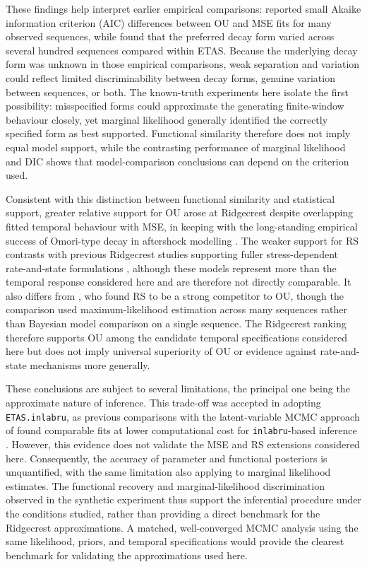 \documentclass{statsmsc}
\begin{document}
These findings help interpret earlier empirical comparisons: \citet{gross1994tests} reported small Akaike information criterion (AIC) differences between OU and MSE fits for many observed sequences, while \citet{hainzl2017testing} found that the preferred decay form varied across several hundred sequences compared within ETAS. Because the underlying decay form was unknown in those empirical comparisons, weak separation and variation could reflect limited discriminability between decay forms, genuine variation between sequences, or both. The known-truth experiments here isolate the first possibility: misspecified forms could approximate the generating finite-window behaviour closely, yet marginal likelihood generally identified the correctly specified form as best supported. Functional similarity therefore does not imply equal model support, while the contrasting performance of marginal likelihood and DIC shows that model-comparison conclusions can depend on the criterion used.
 
Consistent with this distinction between functional similarity and statistical support, greater relative support for OU arose at Ridgecrest despite overlapping fitted temporal behaviour with MSE, in keeping with the long-standing empirical success of Omori-type decay in aftershock modelling \citep{utsu1995centenary}. The weaker support for RS contrasts with previous Ridgecrest studies supporting fuller stress-dependent rate-and-state formulations \citep{mancini2020predictive}, although these models represent more than the temporal response considered here and are therefore not directly comparable. It also differs from \citet{hainzl2017testing}, who found RS to be a strong competitor to OU, though the comparison used maximum-likelihood estimation across many sequences rather than Bayesian model comparison on a single sequence. The Ridgecrest ranking therefore supports OU among the candidate temporal specifications considered here but does not imply universal superiority of OU or evidence against rate-and-state mechanisms more generally.

These conclusions are subject to several limitations, the principal one being the approximate nature of inference. This trade-off was accepted in adopting \texttt{ETAS.inlabru}, as previous comparisons with the latent-variable MCMC approach of \citet{ross2021bayesian} found comparable fits at lower computational cost for \texttt{inlabru}-based inference \citep{serafini2023approximation, li2024spatio}. However, this evidence does not validate the MSE and RS extensions considered here. Consequently, the accuracy of parameter and functional posteriors is unquantified, with the same limitation also applying to marginal likelihood estimates. The functional recovery and marginal-likelihood discrimination observed in the synthetic experiment thus support the inferential procedure under the conditions studied, rather than providing a direct benchmark for the Ridgecrest approximations. A matched, well-converged MCMC analysis using the same likelihood, priors, and temporal specifications would provide the clearest benchmark for validating the approximations used here.
\end{document}
